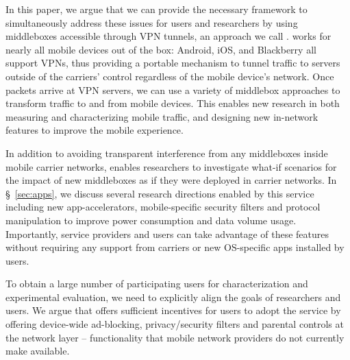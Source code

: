 
In this paper, we argue that we can provide the necessary framework to
simultaneously address these issues for users and researchers by using
middleboxes accessible through VPN tunnels, an approach we call
\meddle.  \meddle works for nearly all mobile devices out of the box:
Android, iOS, and Blackberry all support VPNs, thus providing a
portable mechanism to tunnel traffic to servers outside of the
carriers' control regardless of the mobile device's network.  Once
packets arrive at VPN servers, we can use a variety of middlebox
approaches to transform traffic to and from mobile devices. This
enables new research in both measuring and characterizing mobile
traffic, and designing new in-network features to improve the mobile
experience.

In addition to avoiding transparent interference from any  
middleboxes inside mobile carrier networks, \meddle 
enables researchers to investigate what-if scenarios for the 
impact of new middleboxes as if they were deployed in carrier 
networks. In \S~\ref{sec:apps}, we discuss several research 
directions enabled by this service including new app-accelerators, 
mobile-specific security filters and protocol manipulation 
to improve power consumption and data volume usage. Importantly, 
service providers and users can take advantage of these features 
without requiring any support from carriers or new OS-specific 
apps installed by users.

To obtain a large number of participating users for characterization
and experimental evaluation, we need to explicitly align the goals of
researchers and users. We argue that \meddle offers sufficient
incentives for users to adopt the service by offering device-wide
ad-blocking, privacy/security filters and parental controls at the
network layer -- functionality that mobile network providers do not
currently make available.


